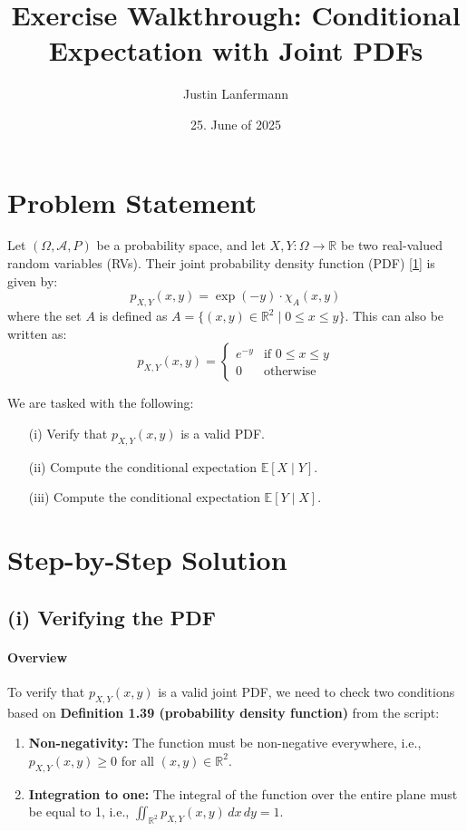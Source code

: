 \documentclass[11pt,a4paper]{article}
\title{Exercise Walkthrough: Conditional Expectation with Joint PDFs}
\author{Justin Lanfermann}
\date{25. June of 2025}
\begin{document}
\maketitle

\section{Problem Statement}

Let $(\Omega, \mathcal{A}, P)$ be a probability space, and let $X, Y: \Omega \to \mathbb{R}$ be two real-valued random variables (RVs). Their joint probability density function (PDF) \hyperlink{ref:pdf}{[1]} is given by:
\[
p_{X,Y}(x,y) = \exp(-y) \cdot \chi_A(x,y)
\]
where the set $A$ is defined as $A = \{(x,y) \in \mathbb{R}^2 \mid 0 \le x \le y\}$. This can also be written as:
\[
p_{X,Y}(x,y) =
\begin{cases}
e^{-y} & \text{if } 0 \le x \le y \\
0 & \text{otherwise}
\end{cases}
\]

We are tasked with the following:
\begin{itemize}
    \item[(i)] Verify that $p_{X,Y}(x,y)$ is a valid PDF.
    \item[(ii)] Compute the conditional expectation $\mathbb{E}[X \mid Y]$.
    \item[(iii)] Compute the conditional expectation $\mathbb{E}[Y \mid X]$.
\end{itemize}

\hrulefill
\vspace{1cm}

\section{Step-by-Step Solution}

\subsection{(i) Verifying the PDF}

\paragraph{Overview}
To verify that $p_{X,Y}(x,y)$ is a valid joint PDF, we need to check two conditions based on \textbf{Definition 1.39 (probability density function)} from the script:
\begin{enumerate}
    \item \textbf{Non-negativity:} The function must be non-negative everywhere, i.e., $p_{X,Y}(x,y) \ge 0$ for all $(x,y) \in \mathbb{R}^2$.
    \item \textbf{Integration to one:} The integral of the function over the entire plane must be equal to 1, i.e., $\iint_{\mathbb{R}^2} p_{X,Y}(x,y) \,dx\,dy = 1$.
\end{enumerate}
\end{document}
